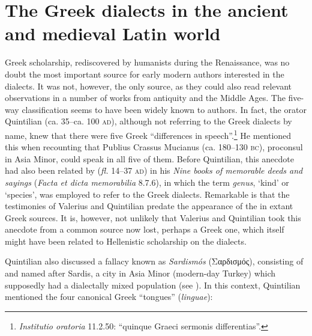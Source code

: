 \section{The Greek dialects in the ancient and medieval Latin world}\label{sec:2.5}

Greek scholarship, rediscovered by humanists during the Renaissance, was no doubt the most important source for early modern authors interested in the dialects. It was not, however, the only source, as they could also read relevant observations in a number of  works from antiquity and the Middle Ages. The five-way classification seems to have been widely known to  authors. In fact, the  orator Quintilian (ca. 35–ca. 100 \textsc{ad}), although not referring to the Greek dialects by name, knew that there were five Greek “differences in speech”.\footnote{{\textit{Institutio oratoria}} {11.2.50: “quinque Graeci sermonis differentias”.}} He mentioned this when recounting that Publius Crassus Mucianus (ca. 180–130 \textsc{bc}),  proconsul in Asia Minor, could speak in all five of them. Before Quintilian, this anecdote had also been related by  (\textit{fl.} 14–37 \textsc{ad}) in his \textit{Nine books of memorable deeds and sayings} (\textit{Facta et dicta memorabilia} 8.7.6), in which the  term \textit{genus}, ‘kind’ or ‘species’, was employed to refer to the Greek dialects. Remarkable is that the testimonies of Valerius and Quintilian predate the appearance of the  in extant Greek sources. It is, however, not unlikely that Valerius and Quintilian took this anecdote from a common source now lost, perhaps a Greek one, which itself might have been related to Hellenistic scholarship on the dialects.

Quintilian also discussed a fallacy known as \textit{Sardismós} (Σαρδισμός), consisting of  and named after Sardis, a city in Asia Minor (modern-day Turkey) which supposedly had a dialectally mixed population (see \citealt{Gitner2018}). In this context, Quintilian mentioned the four canonical Greek “tongues” (\textit{linguae}):

